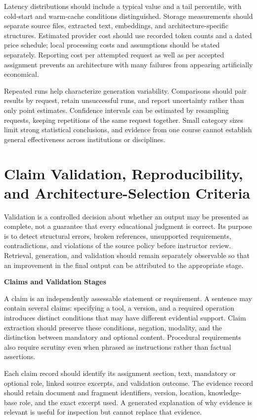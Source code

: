 \documentclass[12pt,a4paper]{report}
\numberwithin{equation}{chapter}
\begin{document}
Latency distributions should include a typical value and a tail percentile, with cold-start and warm-cache conditions distinguished. Storage measurements should separate source files, extracted text, embeddings, and architecture-specific structures. Estimated provider cost should use recorded token counts and a dated price schedule; local processing costs and assumptions should be stated separately. Reporting cost per attempted request as well as per accepted assignment prevents an architecture with many failures from appearing artificially economical.

Repeated runs help characterize generation variability. Comparisons should pair results by request, retain unsuccessful runs, and report uncertainty rather than only point estimates. Confidence intervals can be estimated by resampling requests, keeping repetitions of the same request together. Small category sizes limit strong statistical conclusions, and evidence from one course cannot establish general effectiveness across institutions or disciplines.

\section{Claim Validation, Reproducibility, and Architecture-Selection Criteria}

Validation is a controlled decision about whether an output may be presented as complete, not a guarantee that every educational judgment is correct. Its purpose is to detect structural errors, broken references, unsupported requirements, contradictions, and violations of the source policy before instructor review. Retrieval, generation, and validation should remain separately observable so that an improvement in the final output can be attributed to the appropriate stage.

\par\medskip
\textbf{Claims and Validation Stages}

A claim is an independently assessable statement or requirement. A sentence may contain several claims: specifying a tool, a version, and a required operation introduces distinct conditions that may have different evidential support. Claim extraction should preserve these conditions, negation, modality, and the distinction between mandatory and optional content. Procedural requirements also require scrutiny even when phrased as instructions rather than factual assertions.

Each claim record should identify its assignment section, text, mandatory or optional role, linked source excerpts, and validation outcome. The evidence record should retain document and fragment identifiers, version, location, knowledge-base role, and the exact excerpt used. A generated explanation of why evidence is relevant is useful for inspection but cannot replace that evidence.
\end{document}
